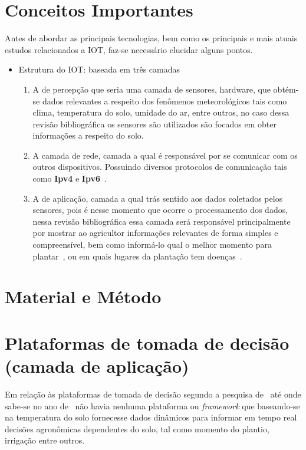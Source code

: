 \documentclass[
	article,			%
	12pt,				%
	oneside,			%
	a4paper,			%
	english,			%
	brazil,				%
	sumario=tradicional
	]{abntex2}
\begin{document}
\section{Conceitos Importantes}\label{Conceitos Importantes}
Antes de abordar as principais tecnologias, bem como os principais e mais atuais estudos relacionados a IOT, faz-se necessário elucidar alguns pontos.
\begin{itemize}
  \item Estrutura do IOT: baseada em três camadas~\cite{5}

    \begin{enumerate}
    \item A de percepção que seria uma camada de sensores, hardware, que obtém-se dados relevantes a respeito dos fenômenos meteorológicos tais como clima, temperatura do solo, umidade do ar, entre outros, no caso dessa revisão bibliográfica os sensores são utilizados são focados em obter informações a respeito do solo.
    \item A camada de rede, camada a qual é responsável por se comunicar com os outros dispositivos. Possuindo diversos protocolos de comunicação tais como \textbf{Ipv4} e \textbf{Ipv6}~\cite{camada2}.
    \item A de aplicação, camada a qual trás sentido aos dados coletados pelos sensores, pois é nesse momento que ocorre o processamento dos dados, nessa revisão bibliográfica essa camada será responsável principalmente por mostrar ao agricultor informações relevantes de forma simples e compreensível, bem como informá-lo qual o melhor momento para plantar~\cite{1}, ou em quais lugares da plantação tem doenças~\cite{2}.
    \end{enumerate}
\end{itemize}

\section{Material e Método}\label{Material e Método}
\section{Plataformas de tomada de decisão (camada de aplicação)}\label{Plataformas de tomada de decisão}%
Em relação às plataformas de tomada de decisão segundo a pesquisa de~\citeauthor{1} até onde sabe-se no ano de~\citeyear{1} não havia nenhuma plataforma ou \textit{framework} que baseando-se na temperatura do solo fornecesse dados dinâmicos para informar em tempo real decisões agronômicas dependentes do solo, tal como momento do plantio, irrigação entre outros.
\end{document}
